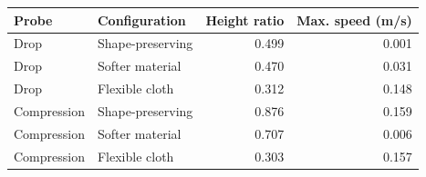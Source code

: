\begin{tabular}{llrr}
\toprule
Probe & Configuration & Height ratio & Max. speed (m/s) \\
\midrule
Drop & Shape-preserving & 0.499 & 0.001 \\
Drop & Softer material & 0.470 & 0.031 \\
Drop & Flexible cloth & 0.312 & 0.148 \\
Compression & Shape-preserving & 0.876 & 0.159 \\
Compression & Softer material & 0.707 & 0.006 \\
Compression & Flexible cloth & 0.303 & 0.157 \\
\bottomrule
\end{tabular}
